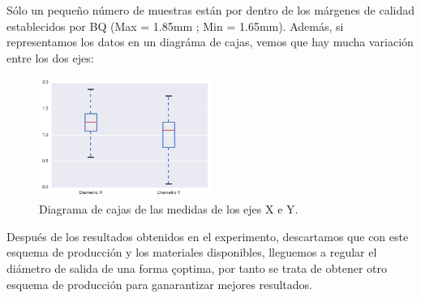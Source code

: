 Sólo un pequeño número de muestras están por dentro de los márgenes de calidad establecidos por BQ (Max = 1.85mm ; Min = 1.65mm). Además, si representamos los datos en un diagráma de cajas, vemos que hay mucha variación entre los dos ejes:
\begin{figure}[H]
    \centering
    \includegraphics[width=0.5\textwidth]{images/producciones/16062015/output_10_1.png}
    \caption{Diagrama de cajas de las medidas de los ejes X e Y.}
    \label{fig:prod_boxplot}
\end{figure}

Después de los resultados obtenidos en el experimento, descartamos que con este esquema de producción y los materiales disponibles, lleguemos a regular el diámetro de salida de una forma çoptima, por tanto se trata de obtener otro esquema de producción para ganarantizar mejores resultados.